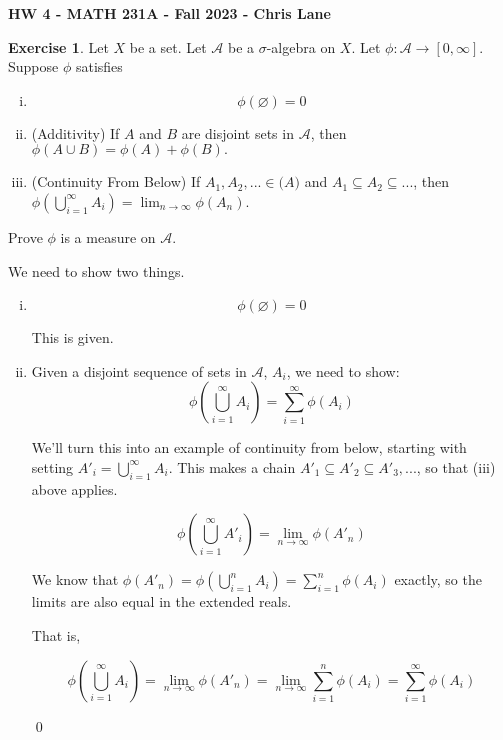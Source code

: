 \documentclass[11pt,oneside]{article}
\numberwithin{equation}{section}
\theoremstyle{definition}
\newtheorem{exercise}{Exercise}
\begin{document}
\textbf{HW 4 - MATH 231A - Fall 2023 - Chris Lane}
\begin{exercise}
  Let $X$ be a set.  Let $\mathcal{A}$ be a $\sigma$-algebra on $X$.  Let $\phi : \mathcal{A} \to [0, \infty]$.
  Suppose $ \phi$ satisfies
  \begin{enumerate}[(i)]
  \item
    $$
    \phi (\varnothing) = 0
    $$
  \item
    (Additivity) If $A$ and $B$ are disjoint sets in $\mathcal{A}$, then $\phi( A \cup B) = \phi(A) + \phi(B).$
  \item
    (Continuity From Below) If $A_1, A_2, ... \in \mathcal(A)$ and $A_1 \subseteq A_2 \subseteq ...$, then
    $\phi ( \bigcup \limits _ {i=1} ^ {\infty} A_i)  = \lim _{n \to \infty} \phi (A_n)$.
  \end{enumerate}
  Prove $\phi$ is a measure on $\mathcal{A}$. 
\end{exercise}
\begin{solution}
  We need to show two things.

  \begin{enumerate}[(i)]
  \item
    $$
    \phi(\varnothing) = 0
    $$

    This is given.
  \item
    Given a disjoint sequence of sets in $\mathcal{A}$, $A_i$, we need to show:
    $$
    \phi(\bigcup \limits_{i=1}^\infty A_i) = \sum \limits _ {i=1} ^ \infty \phi( A_i)
    $$

    We'll turn this into an example of continuity from below, starting with setting
    $ A'_i = \bigcup \limits _{i=1} ^ \infty A_i$.  This makes a chain $ A'_1 \subseteq A'_2 \subseteq A'_3, ... $, so that (iii) above applies.

    $$
    \phi(\bigcup \limits_{i=1}^\infty A'_i) = \lim \limits _{n \to \infty} \phi(A'_n) 
    $$

    We know that $\phi(A'_n) = \phi( \bigcup \limits _ {i = 1} ^ n A_i) = \sum \limits _{i=1}^n \phi(A_i) $ exactly, so the limits are also
    equal in the extended reals.

    That is,

    $$
    \phi(\bigcup \limits_{i=1}^\infty A_i) = \lim \limits _ {n \to \infty} \phi(A'_n) = \lim \limits_{n \to \infty} \sum \limits _ {i=1} ^n \phi( A_i) = \sum \limits_{i=1} ^\infty \phi(A_i)
    $$

    \qed
    
  \end{enumerate}

\end{solution}
\end{document}
